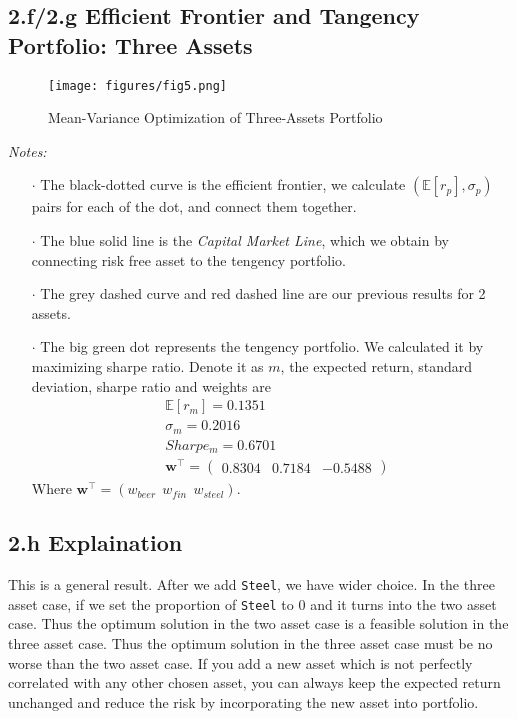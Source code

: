 \documentclass[10 pt]{hwtemplate} %
\begin{document}
\subsection*{2.f/2.g Efficient Frontier and Tangency Portfolio: Three Assets}
\begin{figure}[H]
  \centering
  \captionsetup{justification=centering}
  \caption{\label{fig:meanvar2}Mean-Variance Optimization of Three-Assets Portfolio}
  \vspace{-10pt}
  \texttt{[image: figures/fig5.png]}
\end{figure}
\textit{Notes: }
\begin{itemize}
  \item[$\cdot$] The black-dotted curve is the efficient frontier, we calculate $(\mathbb{E}\left[r_p\right], \sigma_p)$ pairs for each of the dot, and connect them together.
  \item[$\cdot$] The blue solid line is the \textit{Capital Market Line}, which we obtain by connecting risk free asset to the tengency portfolio.
  \item[$\cdot$] The grey dashed curve and red dashed line are our previous results for 2 assets.
  \item[$\cdot$] The big green dot represents the tengency portfolio. We calculated it by maximizing sharpe ratio. Denote it as $m$, the expected return, standard deviation, sharpe ratio and weights are
  \begin{equation}
    \begin{split}
      &\mathbb{E}\left[r_m\right] = 0.1351\\
      &\sigma_m = 0.2016\\
      &Sharpe_m = 0.6701 \\
      &\bm{w}^{\top} = \begin{pmatrix}
        0.8304 & 0.7184 & -0.5488
      \end{pmatrix}
    \end{split}
  \end{equation}
  Where $\bm{w}^{\top} = (w_{beer}~~w_{fin}~~w_{steel})$.
\end{itemize}

\subsection*{2.h Explaination}
This is a general result. After we add \texttt{Steel}, we have wider choice. In the three asset case, if we set the proportion of \texttt{Steel} to 0 and it turns into the two asset case. Thus the optimum solution in the two asset case is a feasible solution in the three asset case. Thus the optimum solution in the three asset case must be no worse than the two asset case. If you add a new asset which is not perfectly correlated with any other chosen asset, you can always keep the expected return unchanged and reduce the risk by incorporating the new asset into portfolio.
\end{document}
